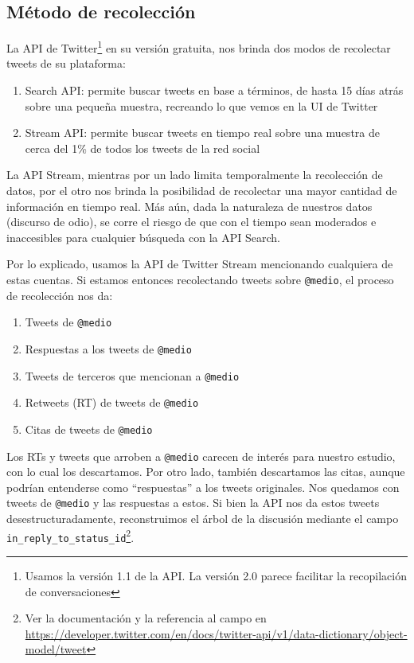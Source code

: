\subsection{Método de recolección}



La API de Twitter\footnote{Usamos la versión 1.1 de la API. La versión 2.0 parece facilitar la recopilación de conversaciones} en su versión gratuita, nos brinda dos modos de recolectar tweets de su plataforma:

\begin{enumerate}
    \item Search API: permite buscar tweets en base a términos, de hasta 15 días atrás sobre una pequeña muestra, recreando lo que vemos en la UI de Twitter
    \item Stream API: permite buscar tweets en tiempo real sobre una muestra de cerca del 1\% de todos los tweets de la red social
\end{enumerate}

La API Stream, mientras por un lado limita temporalmente la recolección de datos, por el otro nos brinda la posibilidad de recolectar una mayor cantidad de información en tiempo real. Más aún, dada la naturaleza de nuestros datos (discurso de odio), se corre el riesgo de que con el tiempo sean moderados e inaccesibles para cualquier búsqueda con la API Search. 


Por lo explicado, usamos la API de Twitter Stream mencionando cualquiera de estas cuentas. Si estamos entonces recolectando tweets sobre \verb|@medio|, el proceso de recolección nos da:

\begin{enumerate}
    \item Tweets de \verb|@medio|
    \item Respuestas a los tweets de \verb|@medio|
    \item Tweets de terceros que mencionan a \verb|@medio|
    \item Retweets (RT) de tweets de \verb|@medio|
    \item Citas de tweets de \verb|@medio|
\end{enumerate}

Los RTs y tweets que arroben a \verb|@medio| carecen de interés para nuestro estudio, con lo cual los descartamos. Por otro lado, también descartamos las citas, aunque podrían entenderse como ``respuestas'' a los tweets originales. Nos quedamos con tweets de \verb|@medio| y las respuestas a estos. Si bien la API nos da estos tweets desestructuradamente, reconstruimos el árbol de la discusión mediante el campo \verb|in_reply_to_status_id|\footnote{Ver la documentación y la referencia al campo en \url{https://developer.twitter.com/en/docs/twitter-api/v1/data-dictionary/object-model/tweet}}.

